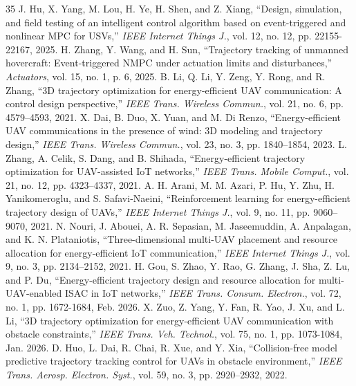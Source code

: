 \documentclass[lettersize,journal]{IEEEtran}
\begin{document}
\begin{thebibliography}{35}
	 J. Hu, X. Yang, M. Lou, H. Ye, H. Shen, and Z. Xiang, ``Design, simulation, and field testing of an intelligent control algorithm based on event-triggered and nonlinear MPC for USVs,'' \textit{IEEE Internet Things J.}, vol. 12, no. 12, pp. 22155-22167, 2025.
	 H. Zhang, Y. Wang, and H. Sun, ``Trajectory tracking of unmanned hovercraft: Event-triggered NMPC under actuation limits and disturbances,'' \textit{Actuators}, vol. 15, no. 1, p. 6, 2025.
	 B. Li, Q. Li, Y. Zeng, Y. Rong, and R. Zhang, ``3D trajectory optimization for energy-efficient UAV communication: A control design perspective,'' \textit{IEEE Trans. Wireless Commun.}, vol. 21, no. 6, pp. 4579--4593, 2021.
	 X. Dai, B. Duo, X. Yuan, and M. Di Renzo, ``Energy-efficient UAV communications in the presence of wind: 3D modeling and trajectory design,'' \textit{IEEE Trans. Wireless Commun.}, vol. 23, no. 3, pp. 1840--1854, 2023.
	 L. Zhang, A. Celik, S. Dang, and B. Shihada, ``Energy-efficient trajectory optimization for UAV-assisted IoT networks,'' \textit{IEEE Trans. Mobile Comput.}, vol. 21, no. 12, pp. 4323--4337, 2021.
	 A. H. Arani, M. M. Azari, P. Hu, Y. Zhu, H. Yanikomeroglu, and S. Safavi-Naeini, ``Reinforcement learning for energy-efficient trajectory design of UAVs,'' \textit{IEEE Internet Things J.}, vol. 9, no. 11, pp. 9060--9070, 2021.
	 N. Nouri, J. Abouei, A. R. Sepasian, M. Jaseemuddin, A. Anpalagan, and K. N. Plataniotis, ``Three-dimensional multi-UAV placement and resource allocation for energy-efficient IoT communication,'' \textit{IEEE Internet Things J.}, vol. 9, no. 3, pp. 2134--2152, 2021.
	 H. Gou, S. Zhao, Y. Rao, G. Zhang, J. Sha, Z. Lu, and P. Du, ``Energy-efficient trajectory design and resource allocation for multi-UAV-enabled ISAC in IoT networks,'' \textit{IEEE Trans. Consum. Electron.}, vol. 72, no. 1, pp. 1672-1684, Feb. 2026.
	 X. Zuo, Z. Yang, Y. Fan, R. Yao, J. Xu, and L. Li, ``3D trajectory optimization for energy-efficient UAV communication with obstacle constraints,'' \textit{IEEE Trans. Veh. Technol.}, vol. 75, no. 1, pp. 1073-1084, Jan. 2026.
	 D. Huo, L. Dai, R. Chai, R. Xue, and Y. Xia, ``Collision-free model predictive trajectory tracking control for UAVs in obstacle environment,'' \textit{IEEE Trans. Aerosp. Electron. Syst.}, vol. 59, no. 3, pp. 2920--2932, 2022.
	
\end{thebibliography}

\vfill
\end{document}
